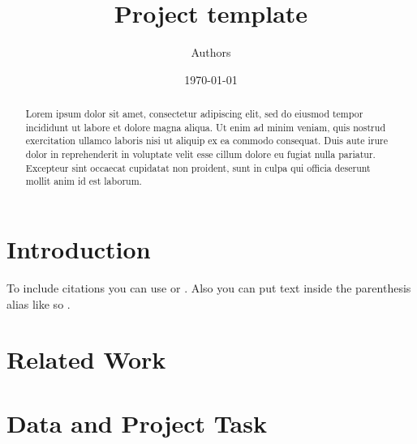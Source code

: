 \documentclass{article}
\title{Project template}
\author{Authors}
\date{\today}
\begin{document}
\maketitle
\newpage

\tableofcontents
\newpage

\begin{abstract}
    Lorem ipsum dolor sit amet, consectetur adipiscing elit, sed do eiusmod tempor incididunt ut labore et dolore magna aliqua. Ut enim ad minim veniam, quis nostrud exercitation ullamco laboris nisi ut aliquip ex ea commodo consequat. Duis aute irure dolor in reprehenderit in voluptate velit esse cillum dolore eu fugiat nulla pariatur. Excepteur sint occaecat cupidatat non proident, sunt in culpa qui officia deserunt mollit anim id est laborum.
\end{abstract}
\newpage


\section{Introduction}
\label{sec:introduction}

To include citations you can use \citet{GaiaDR22018} or \citep{GaiaDR22018}. Also you can put text inside the parenthesis alias like so \citet[][; Table 3]{GaiaDR22018}.

\section{Related Work}
\label{sec:related_work}


\section{Data and Project Task}
\label{sec:data_and_project_tasks}
\end{document}
